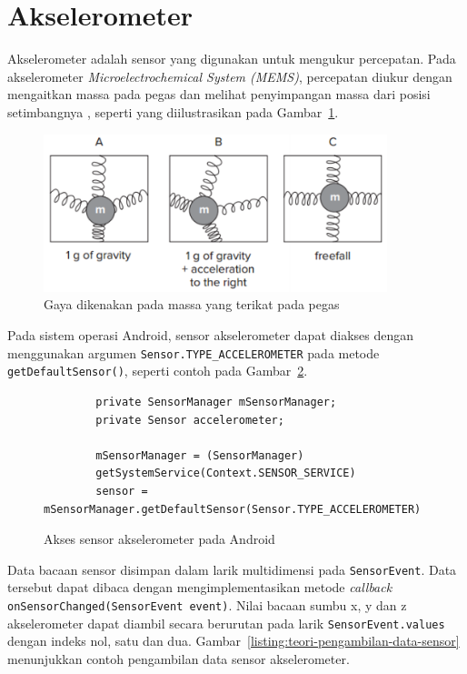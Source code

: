 \section{Akselerometer}
Akselerometer adalah sensor yang digunakan untuk mengukur percepatan. Pada akselerometer \textit{Microelectrochemical System (MEMS)}, percepatan diukur dengan mengaitkan massa pada pegas dan melihat penyimpangan massa dari posisi setimbangnya \Parencite{milette-2012}, seperti yang diilustrasikan pada Gambar~\ref{gambar:akselerometer-mems}.

\begin{figure}[h!]
    \centering
    \includegraphics[width=10cm]{gambar/landasan-teori/akselerometer-mems.png}
    \caption{Gaya dikenakan pada massa yang terikat pada pegas \Parencite{milette-2012}}
    \label{gambar:akselerometer-mems}
\end{figure}

Pada sistem operasi Android, sensor akselerometer dapat diakses dengan menggunakan argumen \texttt{Sensor.TYPE_ACCELEROMETER} pada metode \texttt{getDefaultSensor()}, seperti contoh pada Gambar~\ref{listing:teori-akses-akselerometer}.

\begin{figure}[h]
    \begin{verbatim}
        private SensorManager mSensorManager;
        private Sensor accelerometer;

        mSensorManager = (SensorManager)
        getSystemService(Context.SENSOR_SERVICE)
        sensor = mSensorManager.getDefaultSensor(Sensor.TYPE_ACCELEROMETER)
    \end{verbatim}
    \caption{Akses sensor akselerometer pada Android}
    \label{listing:teori-akses-akselerometer}
\end{figure}

Data bacaan sensor disimpan dalam larik multidimensi pada \texttt{SensorEvent}. Data tersebut dapat dibaca dengan mengimplementasikan metode \textit{callback} \linebreak \texttt{onSensorChanged(SensorEvent event)}. Nilai bacaan sumbu x, y dan z akselerometer dapat diambil secara berurutan pada larik \texttt{SensorEvent.values} dengan indeks nol, satu dan dua. Gambar~\ref{listing:teori-pengambilan-data-sensor} menunjukkan contoh pengambilan data sensor akselerometer.

